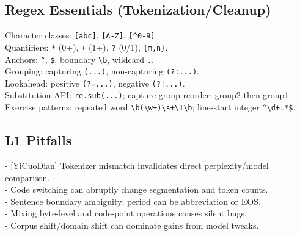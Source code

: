 \subsection*{Regex Essentials (Tokenization/Cleanup)}
Character classes: \verb|[abc]|, \verb|[A-Z]|, \verb|[^0-9]|.\\
Quantifiers: \verb|*| (0+), \verb|+| (1+), \verb|?| (0/1), \verb|{m,n}|.\\
Anchors: \verb|^|, \verb|$|, boundary \verb|\b|, wildcard \verb|.|.\\
Grouping: capturing \verb|(...)|, non-capturing \verb|(?:...)|.\\
Lookahead: positive \verb|(?=...)|, negative \verb|(?!...)|.\\
Substitution API: \texttt{re.sub(...)}; capture-group reorder: group2 then group1.\\
Exercise patterns: repeated word \verb|\b(\w+)\s+\1\b|; line-start integer \verb|^\d+.*$|.

\subsection*{L1 Pitfalls}
- [YiCuoDian] Tokenizer mismatch invalidates direct perplexity/model comparison.\\
- Code switching can abruptly change segmentation and token counts.\\
- Sentence boundary ambiguity: period can be abbreviation or EOS.\\
- Mixing byte-level and code-point operations causes silent bugs.\\
- Corpus shift/domain shift can dominate gains from model tweaks.
